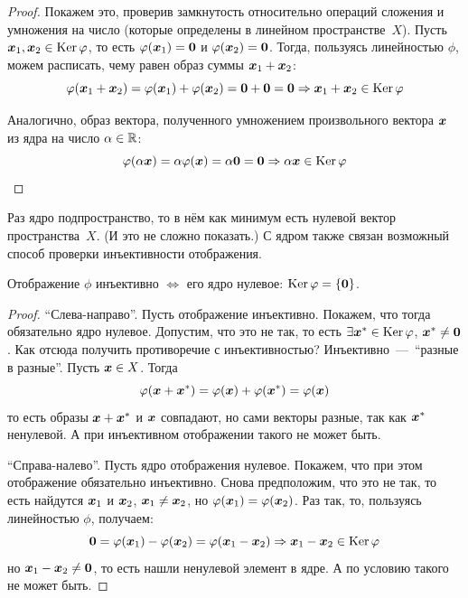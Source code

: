 \documentclass[a4paper,12pt]{article}
\newcommand{\proofindent}{\hspace*{\fill}\par\vspace{0.5em}}
\begin{document}
  \begin{proof}
    Покажем это, проверив замкнутость относительно операций сложения и умножения на число (которые определены в линейном пространстве~$X$).
    Пусть $\bds x_1, \bds x_2 \hm\in \Ker \phi$, то есть $\phi(\bds x_1) \hm= \bds 0$ и $\phi(\bds x_2) \hm= \bds 0$.
    Тогда, пользуясь линейностью $\phi$, можем расписать, чему равен образ суммы $\bds x_1 \hm+ \bds x_2$:
    \[
      \varphi(\boldsymbol x_1 + \boldsymbol x_2) = \varphi(\boldsymbol x_1) + \varphi(\boldsymbol x_2) = \boldsymbol 0 + \boldsymbol 0 = \boldsymbol 0 \Rightarrow \boldsymbol x_1 + \boldsymbol x_2 \in \operatorname{Ker} \varphi
    \]
    
    Аналогично, образ вектора, полученного умножением произвольного вектора $\boldsymbol x$ из ядра на число $\alpha \hm\in \RR$:
    \[
      \varphi(\alpha \boldsymbol x) = \alpha \varphi(\boldsymbol x) = \alpha \boldsymbol 0 = \boldsymbol 0 \Rightarrow \alpha \boldsymbol x \in \operatorname{Ker} \varphi
    \]
  \end{proof}
  
  Раз ядро подпространство, то в нём как минимум есть нулевой вектор пространства~$X$.
  (И это не сложно показать.)
  С ядром также связан возможный способ проверки инъективности отображения.
  
  \begin{proposition}
    \proofindent
    Отображение $\phi$ инъективно $\Leftrightarrow$ его ядро нулевое: $\Ker \phi \hm= \{\bds 0\}$.
  \end{proposition}
  
  \begin{proof}
    ``Слева-направо''.
    Пусть отображение инъективно.
    Покажем, что тогда обязательно ядро нулевое.
    Допустим, что это не так, то есть $\exists \bds x^* \hm\in \Ker \phi$, $\bds x^* \hm{\not=} \bds 0$.
    Как отсюда получить противоречие с инъективностью?
    Инъективно~---~``разные в разные''.
    Пусть $\bds x \hm\in X$.
    Тогда
    \[
      \varphi(\boldsymbol x + \boldsymbol x^*) = \varphi(\boldsymbol x) + \varphi(\boldsymbol x^*) = \varphi(\boldsymbol x)
    \]
    то есть образы $\bds x \hm+ \bds x^*$ и $\boldsymbol x$ совпадают, но сами векторы разные, так как $\boldsymbol x^*$ ненулевой.
    А при инъективном отображении такого не может быть.
    
    ``Справа-налево''.
    Пусть ядро отображения нулевое.
    Покажем, что при этом отображение обязательно инъективно.
    Снова предположим, что это не так, то есть найдутся $\boldsymbol x_1$ и $\boldsymbol x_2$, $\bds x_1 \hm{\not=} \bds x_2$, но $\phi(\bds x_1) \hm= \phi(\bds x_2)$.
    Раз так, то, пользуясь линейностью $\phi$, получаем:
    \[
      \boldsymbol 0 = \varphi(\boldsymbol x_1) - \varphi(\boldsymbol x_2) = \varphi(\boldsymbol x_1 - \boldsymbol x_2) \Rightarrow \boldsymbol x_1 - \boldsymbol x_2 \in \operatorname{Ker} \varphi
    \]
    но $\bds x_1 \hm- \bds x_2 \hm{\not=} \bds 0$, то есть нашли ненулевой элемент в ядре.
    А по условию такого не может быть.
  \end{proof}
  
\end{document}
